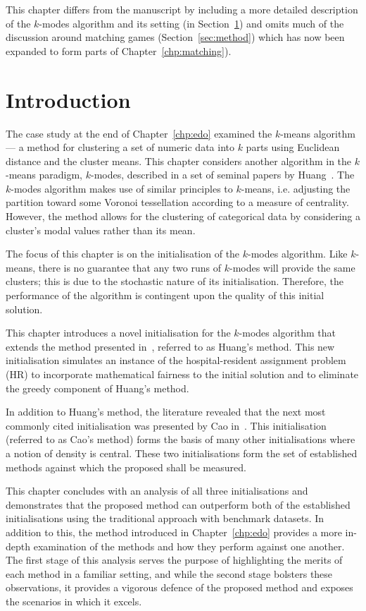 This chapter differs from the manuscript by including a more detailed
description of the \(k\)-modes algorithm and its setting (in
Section~\ref{sec:intro}) and omits much of the discussion around matching games
(Section~\ref{sec:method}) which has now been expanded to form parts of
Chapter~\ref{chp:matching}).

\section{Introduction}\label{sec:intro}

The case study at the end of Chapter~\ref{chp:edo} examined the \(k\)-means
algorithm --- a method for clustering a set of numeric data into \(k\) parts
using Euclidean distance and the cluster means. This chapter considers another
algorithm in the \(k\)-means paradigm, \(k\)-modes, described in a set of
seminal papers by Huang~\cite{Huang1997a, Huang1997b, Huang1998}. The
\(k\)-modes algorithm makes use of similar principles to \(k\)-means, i.e.
adjusting the partition toward some Voronoi tessellation according to a measure
of centrality. However, the method allows for the clustering of categorical data
by considering a cluster's modal values rather than its mean.

The focus of this chapter is on the initialisation of the \(k\)-modes algorithm.
Like \(k\)-means, there is no guarantee that any two runs of \(k\)-modes will
provide the same clusters; this is due to the stochastic nature of its
initialisation. Therefore, the performance of the algorithm is contingent upon
the quality of this initial solution.

This chapter introduces a novel initialisation for the \(k\)-modes algorithm
that extends the method presented in~\cite{Huang1998}, referred to as Huang's
method. This new initialisation simulates an instance of the hospital-resident
assignment problem (HR) to incorporate mathematical fairness to the initial
solution and to eliminate the greedy component of Huang's method.

In addition to Huang's method, the literature revealed that the next most
commonly cited initialisation was presented by Cao in~\cite{Cao2009}. This
initialisation (referred to as Cao's method) forms the basis of many other
initialisations where a notion of density is central. These two initialisations
form the set of established methods against which the proposed shall be
measured.

This chapter concludes with an analysis of all three initialisations and
demonstrates that the proposed method can outperform both of the established
initialisations using the traditional approach with benchmark datasets. In
addition to this, the method introduced in Chapter~\ref{chp:edo} provides a more
in-depth examination of the methods and how they perform against one another.
The first stage of this analysis serves the purpose of highlighting the merits
of each method in a familiar setting, and while the second stage bolsters these
observations, it provides a vigorous defence of the proposed method and exposes
the scenarios in which it excels.

